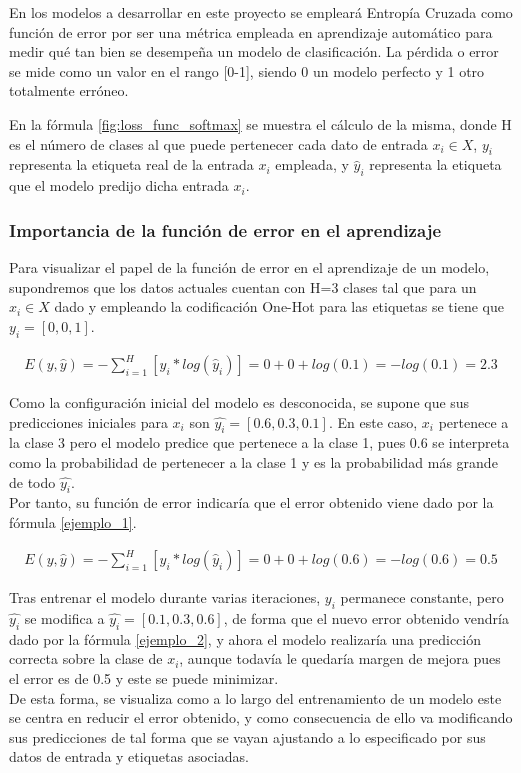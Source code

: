 En los modelos a desarrollar en este proyecto se empleará Entropía Cruzada como función de error por ser una métrica empleada en aprendizaje automático para medir qué tan bien se desempeña un modelo de clasificación. La pérdida o error se mide como un valor en el rango [0-1], siendo 0 un modelo perfecto y 1 otro totalmente erróneo. \cite{Cross_entropy}

En la fórmula \ref{fig:loss_func_softmax} se muestra el cálculo de la misma, donde H es el número de clases al que puede pertenecer cada dato de entrada $x_i \in X$, $y_i$ representa la etiqueta real de la entrada $x_i$ empleada, y $\hat{y}_i$ representa la etiqueta que el modelo predijo dicha entrada $x_i$.  \\

\subsubsection{Importancia de la función de error en el aprendizaje}

Para visualizar el papel de la función de error en el aprendizaje de un modelo, supondremos que los datos actuales cuentan con H=3 clases tal que para un $x_i \in X$ dado y empleando la codificación One-Hot para las etiquetas se tiene que $y_i = [0, 0, 1]$. 

\begin{gather}
	E(y, \hat{y}) = - \sum_{i=1}^{H}  [y_i * log( \hat{y}_i)] = 0 + 0 + log(0.1) = -log(0.1) = 2.3
	\label{ejemplo_1}
\end{gather}

Como la configuración inicial del modelo es desconocida, se supone que sus predicciones iniciales para $x_i$ son $\hat{y_i} = [ 0.6, 0.3, 0.1]$. En este caso, $x_i$ pertenece a la clase 3 pero el modelo predice que pertenece a la clase 1, pues 0.6 se interpreta como la probabilidad de pertenecer a la clase 1 y es la probabilidad más grande de todo $\hat{y_i}$.\\
Por tanto, su función de error indicaría que el error obtenido viene dado por la fórmula \ref{ejemplo_1}.

\begin{gather}
	E(y, \hat{y}) = - \sum_{i=1}^{H}  [y_i * log( \hat{y}_i)] = 0 + 0 + log(0.6) = -log(0.6) = 0.5
	\label{ejemplo_2}
\end{gather}

Tras entrenar el modelo durante varias iteraciones, $y_i$ permanece constante, pero $\hat{y_i}$ se modifica a $\hat{y_i} = [0.1, 0.3, 0.6]$, de forma que el nuevo error obtenido vendría dado por la fórmula \ref{ejemplo_2}, y ahora el modelo realizaría una predicción correcta sobre la clase de $x_i$, aunque todavía le quedaría margen de mejora pues el error es de 0.5 y este se puede minimizar. \\
De esta forma, se visualiza como a lo largo del entrenamiento de un modelo este se centra en reducir el error obtenido, y como consecuencia de ello va modificando sus predicciones de tal forma que se vayan ajustando a lo especificado por sus datos de entrada y etiquetas asociadas.


